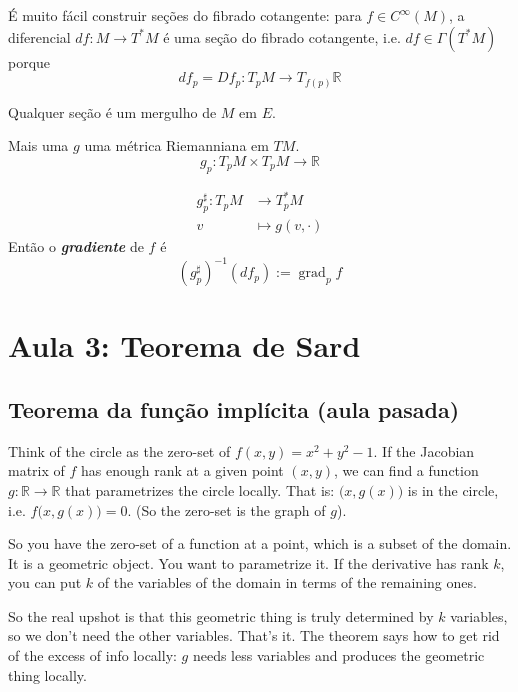 É muito fácil construir seções do fibrado cotangente: para \(f \in C^\infty(M)\), a diferencial \(df :M \to T^*M\) é uma seção do fibrado cotangente, i.e. \(df \in \Gamma(T^*M)\) porque
\[df_p=Df_p:T_pM \to T_{f(p)}\mathbb{R}\]

\begin{exercise}\leavevmode
	Qualquer seção é um mergulho de \(M\) em \(E\).
\end{exercise}

\begin{thing6}{Mais uma}\leavevmode
$g$ uma métrica Riemanniana em \(TM\).
\[g_p:T_pM \times T_p M \to \mathbb{R}\]

\begin{align*}
	g_p^\sharp :T_pM &\longrightarrow  T^*_pM\\
	v &\longmapsto g(v,\cdot)
\end{align*}
Então o \textit{\textbf{gradiente}} de \(f\) é
\[(g^\sharp _p)^{-1}(df_p):=\operatorname{grad}_pf\]
\end{thing6}

\section{Aula 3: Teorema de Sard}

\subsection*{Teorema da função implícita (aula pasada)}

\begin{upshot}\leavevmode
Think of the circle as the zero-set of \(f(x,y)=x^2+y^2-1\). If the Jacobian matrix of $f$ has enough rank at a given point \((x,y)\), we can find a function \(g: \mathbb{R} \to \mathbb{R}\) that parametrizes the circle locally. That is: \(\Big(x,g(x)\Big)\) is in the circle, i.e. \(f\Big(x,g(x) \Big)=0\). (So the zero-set is the graph of \(g\)).

So you have the zero-set of a function at a point, which is a subset of the domain. It is a geometric object. You want to parametrize it. If the derivative has rank  \(k\), you can put \(k\) of the variables of the domain in terms of the remaining ones.

So the real upshot is that this geometric thing is truly determined by \(k\) variables, so we don't need the other variables. That's it. The theorem says how to get rid of the excess of info locally: \(g\) needs less variables and produces the geometric thing locally.
\end{upshot}

